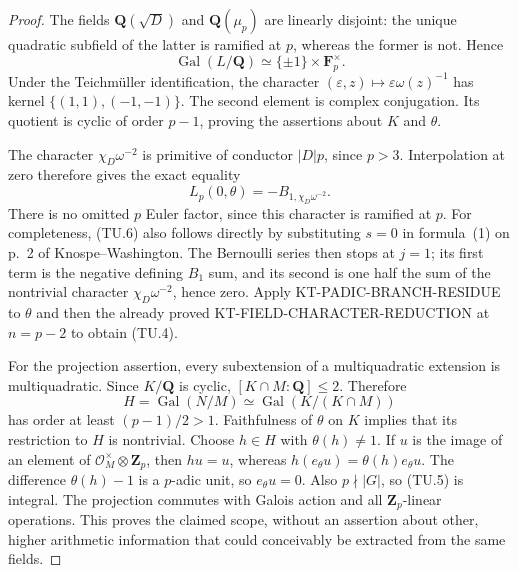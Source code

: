 \documentclass[11pt,a4paper]{article}
\theoremstyle{definition}
\begin{document}
\begin{proof}
The fields $\mathbf Q(\sqrt D)$ and $\mathbf Q(\mu_p)$ are
linearly disjoint: the unique quadratic subfield of the latter
is ramified at $p$, whereas the former is not.  Hence
\[
 \operatorname{Gal}(L/\mathbf Q)
       \simeq\{\pm1\}\times\mathbf F_p^\times.
\]
Under the Teichm\"uller identification, the character
$(\varepsilon,z)\mapsto\varepsilon\omega(z)^{-1}$ has kernel
$\{(1,1),(-1,-1)\}$.  The second element is complex
conjugation.  Its quotient is cyclic of order $p-1$, proving
the assertions about $K$ and $\theta$.

The character $\chi_D\omega^{-2}$ is primitive of conductor
$|D|p$, since $p>3$.  Interpolation at zero therefore gives the
exact equality
\[
                     L_p(0,\theta)=-B_{1,\chi_D\omega^{-2}}.
                                                               \tag{TU.6}
\]
There is no omitted $p$ Euler factor, since this character is
ramified at $p$.  For completeness, (TU.6) also follows directly
by substituting $s=0$ in formula~(1) on p.~2 of
Knospe--Washington.  The Bernoulli series then stops at $j=1$;
its first term is the negative defining $B_1$ sum, and its
second is one half the sum of the nontrivial character
$\chi_D\omega^{-2}$, hence zero.
Apply KT-PADIC-BRANCH-RESIDUE to $\theta$ and then the already
proved KT-FIELD-CHARACTER-REDUCTION at $n=p-2$ to obtain (TU.4).

For the projection assertion, every subextension of a
multiquadratic extension is multiquadratic.  Since $K/\mathbf Q$
is cyclic, $[K\cap M:\mathbf Q]\le2$.  Therefore
\[
 H=\operatorname{Gal}(N/M)\simeq
       \operatorname{Gal}(K/(K\cap M))
\]
has order at least $(p-1)/2>1$.  Faithfulness of $\theta$ on
$K$ implies that its restriction to $H$ is nontrivial.  Choose
$h\in H$ with $\theta(h)\ne1$.  If $u$ is the image of an
element of $\mathcal O_M^\times\otimes\mathbf Z_p$, then
$hu=u$, whereas $h(e_\theta u)=\theta(h)e_\theta u$.
The difference $\theta(h)-1$ is a $p$-adic unit, so
$e_\theta u=0$.  Also $p\nmid|G|$, so (TU.5) is integral.
The projection commutes with Galois action and all
$\mathbf Z_p$-linear operations.  This proves the claimed
scope, without an assertion about other, higher arithmetic
information that could conceivably be extracted from the same
fields.
\end{proof}
\end{document}
